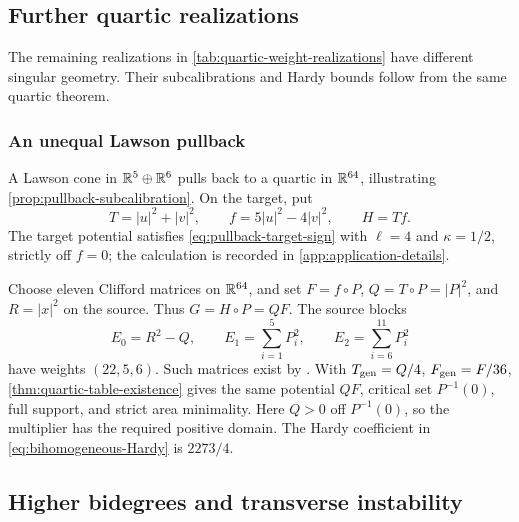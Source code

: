






\subsection{Further quartic realizations}

The remaining realizations in \cref{tab:quartic-weight-realizations}
have different singular geometry. Their subcalibrations and Hardy
bounds follow from the same quartic theorem.




\subsubsection{An unequal Lawson pullback}

\begin{example}
\label{ex:lawson-pullback}
A Lawson cone in $\mathbb R^5\oplus\mathbb R^6$ pulls back to a quartic in
$\mathbb R^{64}$, illustrating \cref{prop:pullback-subcalibration}.
On the target, put
\[
 T=|u|^2+|v|^2,\qquad f=5|u|^2-4|v|^2,\qquad H=Tf.
\]
The target potential satisfies \eqref{eq:pullback-target-sign} with
$\ell=4$ and $\kappa=1/2$, strictly off $f=0$; the calculation is
recorded in \cref{app:application-details}.

Choose eleven Clifford matrices on \(\mathbb R^{64}\), and set
\(F=f\circ P\), \(Q=T\circ P=|P|^2\), and
\(R=|x|^2\) on the source. Thus \(G=H\circ P=QF\).
The source blocks
\[
 E_0=R^2-Q,\qquad E_1=\sum_{i=1}^{5}P_i^2,\qquad
 E_2=\sum_{i=6}^{11}P_i^2
\]
have weights $(22,5,6)$. Such matrices exist by
\cite[Table~4.1]{RiedlerThesis25}. With $T_{\rm gen}=Q/4$,
$F_{\rm gen}=F/36$, \cref{thm:quartic-table-existence} gives the
same potential $QF$, critical set $P^{-1}(0)$, full support, and
strict area minimality. Here $Q>0$ off $P^{-1}(0)$, so the
multiplier has the required positive domain. The Hardy coefficient
in \eqref{eq:bihomogeneous-Hardy} is $2273/4$.
\end{example}




\subsection{Higher bidegrees and transverse instability}

